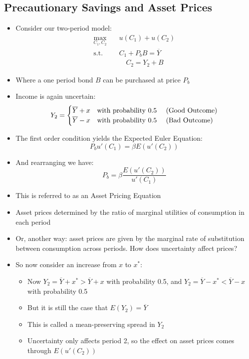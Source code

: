 \documentclass{article}
\numberwithin{equation}{section}
\numberwithin{figure}{section}
\begin{document}
\subsection{Precautionary Savings and Asset Prices}
	\begin{itemize}
		\item Consider our two-period model:
		\begin{align*}
			\max_{C_1,C_2}\quad &u(C_1) + u(C_2) \\
			\text{s.t.}\quad &C_1 + P_b B = \overline{Y} \\
			&\quad C_2 = Y_2 + B
		\end{align*}
		\item Where a one period bond \( B \) can be purchased at price \( P_b \)
		\item Income is again uncertain:
		\[
			Y_2 =
			\begin{cases}
				\overline{Y} + x & \text{with probability 0.5 \quad (Good Outcome)} \\
				\overline{Y} - x & \text{with probability 0.5 \quad (Bad Outcome)}
			\end{cases}
		\]
		\item The first order condition yields the Expected Euler Equation:
		\[
			P_b u'(C_1) = \beta E (u'(C_2))
		\]
		\item And rearranging we have:
		\[
			P_b = \beta \frac{E(u'(C_2))}{u'(C_1)}
		\]
		\item This is referred to as an \textcolor{myblue}{Asset Pricing Equation}
		\item Asset prices determined by the ratio of marginal utilities of consumption in each period
		\item Or, another way: asset prices are given by the marginal rate of substitution between consumption across periods. \textcolor{myblue}{How does uncertainty affect prices?}
		\item So now consider an increase from \( x \) to \( x^* \):
		\begin{itemize}
			\item Now \( Y_2 = \overline{Y} + x^* > \overline{Y} + x \) with probability 0.5, and \( Y_2 = \overline{Y} - x^* < \overline{Y} - x \) with probability 0.5
			\item But it is still the case that \( E(Y_2) = \overline{Y} \)
			\item This is called a \textcolor{myblue}{mean-preserving spread} in \( Y_2 \)
			\item Uncertainty only affects period 2, so the effect on asset prices comes through  \( E(u'(C_2)) \)
		\end{itemize}
	\end{itemize}
\end{document}
